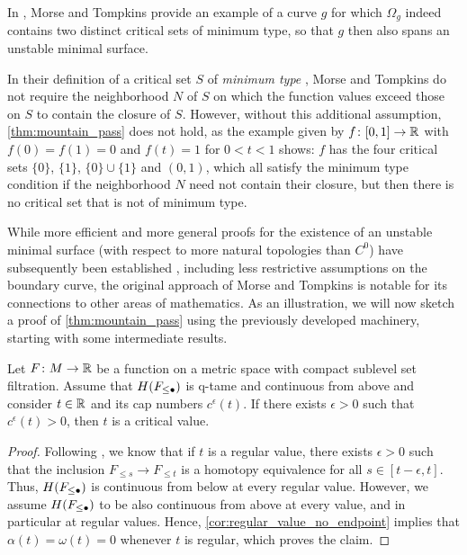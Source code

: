 In \cite[Section 8]{Morse.1939}, Morse and Tompkins provide an example of a curve $g$ for which $\Omega_{g}$ indeed contains two distinct critical sets of minimum type, so that $g$ then also spans an unstable minimal surface.

\begin{rem}
	In their definition of a critical set $S$ of \emph{minimum type} \cite[p.~472]{Morse.1939}, Morse and Tompkins do not require the neighborhood $N$ of $S$ on which the function values exceed those on $S$ to contain the closure of $S$. 
	However, without this additional assumption, \cref{thm:mountain_pass} does not hold, as the example given by $f \colon [0,1] \to \mathbb{R}$ with $f(0) = f(1) = 0$ and $f(t) = 1$ for $0 < t < 1$ shows:
	$f$ has the four critical sets $\{0\}$, $\{1\}$, $\{0\} \cup \{1\}$ and $(0,1)$, which all satisfy the minimum type condition if the neighborhood $N$ need not contain their closure, but then there is no critical set that is not of minimum type.
\end{rem}

While more efficient and more general proofs for the existence of an unstable minimal surface (with respect to more natural topologies than $C^0$) have subsequently been established \cite{Struwe.1988,Dierkes.2010}, including less restrictive assumptions on the boundary curve, the original approach of Morse and Tompkins is notable
for its connections to other areas of mathematics.
As an illustration, we will now sketch a proof of \cref{thm:mountain_pass} using the previously developed machinery, starting with some intermediate results.

\begin{lem}
\label{lem:endpoint_implies_crit_pt}
	Let $F \colon M \to \mathbb{R}$ be a function on a metric space with compact sublevel set filtration. 
	Assume that $H(F_{\leq \bullet})$ is q-tame and continuous from above and consider $t \in \mathbb{R}$ and its cap numbers $c^{\epsilon}(t)$.
	If there exists $\epsilon > 0$ such that $c^{\epsilon}(t) > 0$, then $t$ is a critical value.
\end{lem}
\begin{proof}
	Following \cite[Remark II.6.3]{Struwe.1988}, we know that if $t$ is a regular value, there exists $\epsilon > 0$ such that the inclusion $F_{\leq s} \to F_{\leq t}$ is a homotopy equivalence for all $s \in [t - \epsilon, t]$. 
	Thus, $H(F_{\leq \bullet})$ is continuous from below at every regular value.
	However, we assume $H(F_{\leq \bullet})$ to be also continuous from above at every value, and in particular at regular values. 
	Hence, \cref{cor:regular_value_no_endpoint} implies that $\alpha(t) = \omega(t) = 0$ whenever $t$ is regular, which proves the claim.
\end{proof}


